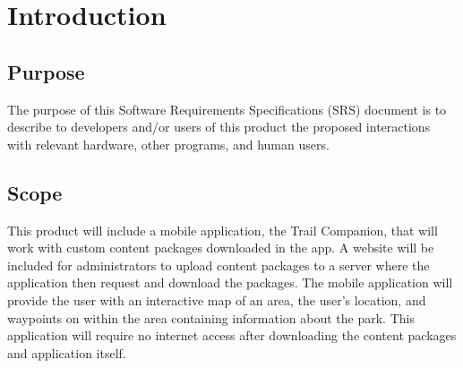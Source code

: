 \documentclass[letterpaper, 10pt,titlepage]{article}
\begin{document}
\section{Introduction}
\subsection{Purpose}
The purpose of this Software Requirements Specifications (SRS) document is to describe to developers and/or users of this product the proposed interactions with relevant hardware, other programs, and human users. 

\subsection{Scope}
This product will include a mobile application, the Trail Companion, that will work with custom content packages downloaded in the app. A website will be included for administrators to upload content packages to a server where the application then request and download the packages. The mobile application will provide the user with an interactive map of an area, the user’s location, and waypoints on within the area containing information about the park. This application will require no internet access after downloading the content packages and application itself.
\end{document}
